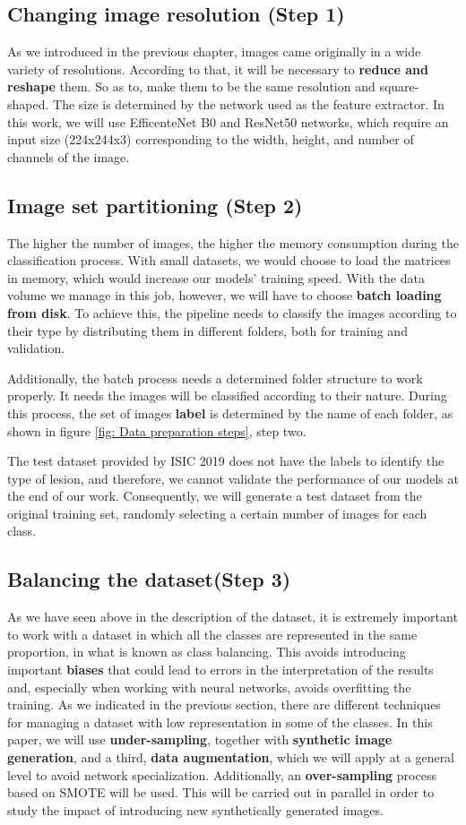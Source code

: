 \subsection{{Changing image resolution (Step 1)}}
As we introduced in the previous chapter, images came originally in a wide variety of resolutions. According to that, it will be necessary to \textbf{reduce and reshape} them. So as to, make them to be the same resolution and square-shaped. The size is determined by the network used as the feature extractor. In this work, we will use EfficenteNet B0 and ResNet50 networks, which require an input size (224x244x3) corresponding to the width, height, and number of channels of the image.

\subsection{{Image set partitioning (Step 2)}}
The higher the number of images, the higher the memory consumption during the classification process. With small datasets, we would choose to load the matrices in memory, which would increase our models' training speed. With the data volume we manage in this job, however, we will have to choose \textbf{batch loading from disk}. To achieve this, the pipeline needs to classify the images according to their type by distributing them in different folders, both for training and validation.

Additionally, the batch process needs a determined folder structure to work properly. It needs the images will be classified according to their nature. During this process, the set of images \textbf{label} is determined by the name of each folder, as shown in figure \ref{fig: Data preparation steps}, step two.

The test dataset provided by ISIC 2019 does not have the labels to identify the type of lesion, and therefore, we cannot validate the performance of our models at the end of our work. Consequently, we will generate a test dataset from the original training set, randomly selecting a certain number of images for each class.


\subsection{{Balancing the dataset(Step 3)}}
As we have seen above in the description of the dataset, it is extremely important to work with a dataset in which all the classes are represented in the same proportion, in what is known as class balancing. This avoids introducing important \textbf{biases} that could lead to errors in the interpretation of the results and, especially when working with neural networks, avoids overfitting the training. As we indicated in the previous section, there are different techniques for managing a dataset with low representation in some of the classes. In this paper, we will use \textbf{under-sampling}, together with \textbf{synthetic image generation}, and a third, \textbf{data augmentation}, which we will apply at a general level to avoid network specialization. Additionally, an \textbf{over-sampling} process based on SMOTE will be used. This will be carried out in parallel in order to study the impact of introducing new synthetically generated images.

